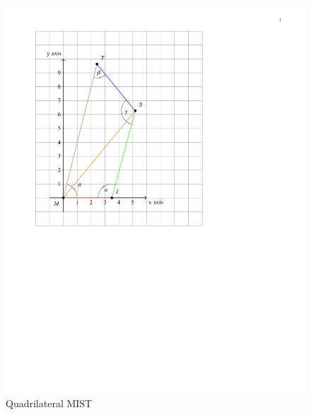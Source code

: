 \documentclass[journal,12pt,twocolumn]{IEEEtran}
\begin{document}
\begin{figure}[!ht]
\centering
\includegraphics[width=\columnwidth, height=12 cm]{Fig1.pdf}
\caption{Quadrilateral MIST}
\label{fig:Quadrilateral MIST}	
\end{figure}
\end{document}
